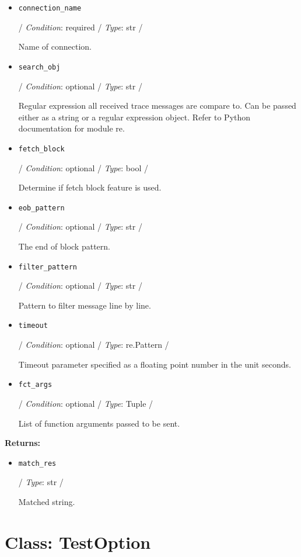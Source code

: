 \begin{itemize}
\item
  \texttt{connection\_name}

  / \emph{Condition}: required / \emph{Type}: str /

  Name of connection.
\item
  \texttt{search\_obj}

  / \emph{Condition}: optional / \emph{Type}: str /

  Regular expression all received trace messages are compare to. Can be
  passed either as a string or a regular expression object. Refer to
  Python documentation for module \textquotesingle re\textquotesingle.
\item
  \texttt{fetch\_block}

  / \emph{Condition}: optional / \emph{Type}: bool /

  Determine if \textquotesingle fetch block\textquotesingle{} feature is
  used.
\item
  \texttt{eob\_pattern}

  / \emph{Condition}: optional / \emph{Type}: str /

  The end of block pattern.
\item
  \texttt{filter\_pattern}

  / \emph{Condition}: optional / \emph{Type}: str /

  Pattern to filter message line by line.
\item
  \texttt{timeout}

  / \emph{Condition}: optional / \emph{Type}: re.Pattern /

  Timeout parameter specified as a floating point number in the unit
  \textquotesingle seconds\textquotesingle.
\item
  \texttt{fct\_args}

  / \emph{Condition}: optional / \emph{Type}: Tuple /

  List of function arguments passed to be sent.
\end{itemize}

\textbf{Returns:}

\begin{itemize}
\item
  \texttt{match\_res}

  / \emph{Type}: str /

  Matched string.
\end{itemize}

\hypertarget{qconnectbase-connection-manager-class-testoption-40}{%
\section{Class: TestOption}\label{qconnectbase-connection-manager-class-testoption-40}}

\begin{Shaded}
\begin{Highlighting}[]
\end{Highlighting}
\end{Shaded}
